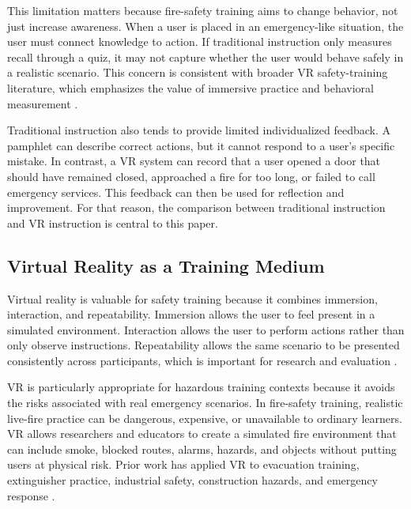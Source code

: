 \documentclass[manuscript, review]{acmart}
\begin{document}
{This limitation matters because fire-safety training aims to change behavior, not just increase awareness. When a user is placed in an emergency-like situation, the user must connect knowledge to action. If traditional instruction only measures recall through a quiz, it may not capture whether the user would behave safely in a realistic scenario. This concern is consistent with broader VR safety-training literature, which emphasizes the value of immersive practice and behavioral measurement \cite{kanade2022use,scorgie2024virtual,bikkina2025learnings}.

Traditional instruction also tends to provide limited individualized feedback. A pamphlet can describe correct actions, but it cannot respond to a user's specific mistake. In contrast, a VR system can record that a user opened a door that should have remained closed, approached a fire for too long, or failed to call emergency services. This feedback can then be used for reflection and improvement. For that reason, the comparison between traditional instruction and VR instruction is central to this paper.

\subsection{Virtual Reality as a Training Medium}

Virtual reality is valuable for safety training because it combines immersion, interaction, and repeatability. Immersion allows the user to feel present in a simulated environment. Interaction allows the user to perform actions rather than only observe instructions. Repeatability allows the same scenario to be presented consistently across participants, which is important for research and evaluation \cite{slater1997five,witmer1998measuring,bailenson2018experience}.

VR is particularly appropriate for hazardous training contexts because it avoids the risks associated with real emergency scenarios. In fire-safety training, realistic live-fire practice can be dangerous, expensive, or unavailable to ordinary learners. VR allows researchers and educators to create a simulated fire environment that can include smoke, blocked routes, alarms, hazards, and objects without putting users at physical risk. Prior work has applied VR to evacuation training, extinguisher practice, industrial safety, construction hazards, and emergency response \cite{kanade2022use,scorgie2024virtual,seo2019interactive,kang2022combining,vercelli2024risk,noghabaei2019virtual,sacks2016construction}.

}
\end{document}
